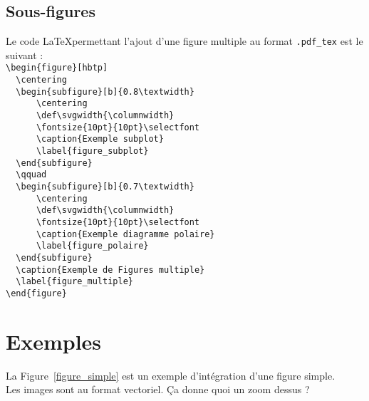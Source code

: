 \documentclass[a4paper,12pt]{report}
\begin{document}
\subsection{Sous-figures}
Le code \LaTeX permettant l'ajout d'une figure multiple au format \verb|.pdf_tex| est le suivant : \\

\verb|\begin{figure}[hbtp]| \\
\verb|	\centering| \\
\verb|	\begin{subfigure}[b]{0.8\textwidth}| \\
\verb|		\centering| \\
\verb|		\def\svgwidth{\columnwidth}| \\
\verb|		\fontsize{10pt}{10pt}\selectfont| \\
\verb|		\caption{Exemple subplot} | \\
\verb|		\label{figure_subplot}| \\
\verb|	\end{subfigure}| \\
\verb|	\qquad| \\
\verb|	\begin{subfigure}[b]{0.7\textwidth}| \\
\verb|		\centering| \\
\verb|		\def\svgwidth{\columnwidth}| \\
\verb|		\fontsize{10pt}{10pt}\selectfont| \\
\verb|		\caption{Exemple diagramme polaire} | \\
\verb|		\label{figure_polaire}| \\
\verb|	\end{subfigure}| \\
\verb|	\caption{Exemple de Figures multiple}| \\
\verb|	\label{figure_multiple}| \\
\verb|\end{figure}| \\



\newpage
\section{Exemples}
La Figure~\ref{figure_simple} est un exemple d'intégration d'une figure simple. \\
Les images sont au format vectoriel. Ça donne quoi un zoom dessus ?
\end{document}
